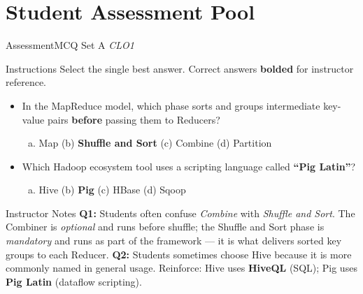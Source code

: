\documentclass[aspectratio=169,10pt]{beamer}
\begin{document}
\section{Student Assessment Pool}

\begin{frame}{Assessment\textemdash MCQ Set A \hfill\small\textit{CLO1}}
  \begin{exampleblock}{Instructions}
    Select the single best answer.  Correct answers \textbf{bolded} for instructor reference.
  \end{exampleblock}
  \vspace{8pt}
  \begin{itemize}
    \item[\textbf{Q1.}] In the MapReduce model, which phase sorts and groups intermediate key-value pairs \textbf{before} passing them to Reducers?
    \begin{enumerate}[(a)]
      \item Map \quad (b) \textbf{Shuffle and Sort} \quad (c) Combine \quad (d) Partition
    \end{enumerate}
  \end{itemize}
  \vspace{8pt}
  \begin{itemize}
    \item[\textbf{Q2.}] Which Hadoop ecosystem tool uses a scripting language called \textbf{``Pig Latin''}?
    \begin{enumerate}[(a)]
      \item Hive \quad (b) \textbf{Pig} \quad (c) HBase \quad (d) Sqoop
    \end{enumerate}
  \end{itemize}
  \vspace{8pt}
  \begin{alertblock}{Instructor Notes}
    \textbf{Q1:} Students often confuse \textit{Combine} with \textit{Shuffle and Sort}.  The Combiner is \emph{optional} and runs before shuffle; the Shuffle and Sort phase is \emph{mandatory} and runs as part of the framework — it is what delivers sorted key groups to each Reducer.  \textbf{Q2:} Students sometimes choose Hive because it is more commonly named in general usage.  Reinforce: Hive uses \textbf{HiveQL} (SQL); Pig uses \textbf{Pig Latin} (dataflow scripting).
  \end{alertblock}
\end{frame}
\end{document}

